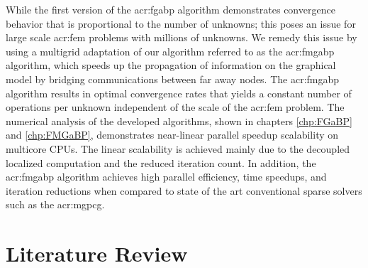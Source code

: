 While the first version of the \gls{acr:fgabp} algorithm demonstrates convergence behavior that is proportional to the number of unknowns; this poses an issue for large scale \gls{acr:fem} problems with millions of unknowns.
We remedy this issue by using a multigrid adaptation of our algorithm referred to as the \gls{acr:fmgabp} algorithm, which speeds up the propagation of information on the graphical model by bridging communications between far away nodes.
The \gls{acr:fmgabp} algorithm results in optimal convergence rates that yields a constant number of operations per unknown independent of the scale of the \gls{acr:fem} problem.
The numerical analysis of the developed algorithms, shown in chapters \ref{chp:FGaBP} and \ref{chp:FMGaBP}, demonstrates near-linear parallel speedup scalability on multicore CPUs.
The linear scalability is achieved mainly due to the decoupled localized computation and the reduced iteration count.
In addition, the \gls{acr:fmgabp} algorithm achieves high parallel efficiency, time speedups, and iteration reductions when compared to state of the art conventional sparse solvers such as the \gls{acr:mgpcg}.


\section{Literature Review}

